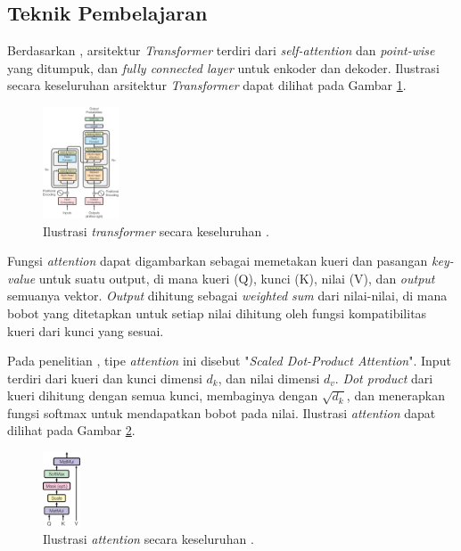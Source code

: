 \documentclass[conference]{IEEEtran}
\begin{document}
	\subsection{Teknik Pembelajaran}
	Berdasarkan \cite{b14}, arsitektur \textit{Transformer} terdiri dari \textit{self-attention} dan \textit{point-wise} yang ditumpuk, dan \textit{fully connected layer} untuk enkoder dan dekoder. Ilustrasi secara keseluruhan arsitektur \textit{Transformer} dapat dilihat pada Gambar \ref{fig:ilustrasi_transformer}.

	\begin{figure}[htbp]
	    \centerline{
	    \includegraphics[width=0.2\textwidth]{resources/overview-transformer.png}}
	    \caption{Ilustrasi \textit{transformer} secara keseluruhan \cite{b14}.}
	    \label{fig:ilustrasi_transformer}
	\end{figure}

	Fungsi \textit{attention} dapat digambarkan sebagai memetakan kueri dan pasangan \textit{key-value} untuk suatu output, di mana kueri (Q), kunci (K), nilai (V), dan \textit{output} semuanya vektor. \textit{Output} dihitung sebagai \textit{weighted sum} dari nilai-nilai, di mana bobot yang ditetapkan untuk setiap nilai dihitung oleh fungsi kompatibilitas kueri dari kunci yang sesuai.

	Pada penelitian \cite{b14}, tipe \textit{attention} ini disebut "\textit{Scaled Dot-Product Attention}". Input terdiri dari kueri dan kunci dimensi \(d_{k}\), dan nilai dimensi \(d_{v}\). \textit{Dot product} dari kueri dihitung dengan semua kunci, membaginya dengan \(\sqrt{d_{k}}\), dan menerapkan fungsi softmax untuk mendapatkan bobot pada nilai. Ilustrasi \textit{attention} dapat dilihat pada Gambar \ref{fig:ilustrasi_attention}.

	\begin{figure}[htbp]
	    \centerline{
	    \includegraphics[width=0.1\textwidth]{resources/overview-attention.png}}
	    \caption{Ilustrasi \textit{attention} secara keseluruhan \cite{b14}.}
	    \label{fig:ilustrasi_attention}
	\end{figure}
\end{document}
